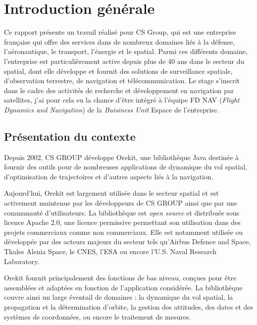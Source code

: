 \chapter*{Introduction générale}
\label{introduction}
\thispagestyle{fancy}

Ce rapport présente un travail réalisé pour CS Group, qui est une entreprise française qui offre des services dans de nombreux domaines liés à la défense, l'aéronautique, le transport, l'énergie et le spatial.
Parmi ces différents domaine, l'entreprise est particulièrement active depuis plus de 40 ans dans le secteur du spatial, dont elle développe et fournit des solutions de surveillance spatiale, d'observation terrestre, de navigation et télécommunication.
Le stage s'inscrit dans le cadre des activités de recherche et développement en navigation par satellites, j'ai pour cela eu la chance d'être intégré à l'équipe FD NAV (\emph{Flight Dynamics and Navigation}) de la \emph{Buisiness Unit} Espace de l'entreprise.



\section{Présentation du contexte}

Depuis 2002, CS GROUP développe Orekit, une bibliothèque Java destinée à fournir des outils pour de nombreuses applications de dynamique du vol spatial, d'optimisation de trajectoires et d'autres aspects liés à la navigation.

Aujourd'hui, Orekit est largement utilisée dans le secteur spatial et est activement maintenue par les développeurs de CS GROUP ainsi que par une communauté d'utilisateurs. La bibliothèque est \textit{open source} et distribuée sous licence Apache 2.0, une licence permissive permettant son utilisation dans des projets commerciaux comme non commerciaux. Elle est notamment utilisée ou développée par des acteurs majeurs du secteur tels qu'Airbus Defence and Space, Thales Alenia Space, le CNES, l'ESA ou encore l'U.S. Naval Research Laboratory.

Orekit fournit principalement des fonctions de bas niveau, conçues pour être assemblées et adaptées en fonction de l'application considérée. La bibliothèque couvre ainsi un large éventail de domaines : la dynamique du vol spatial, la propagation et la détermination d'orbite, la gestion des attitudes, des dates et des systèmes de coordonnées, ou encore le traitement de mesures.


